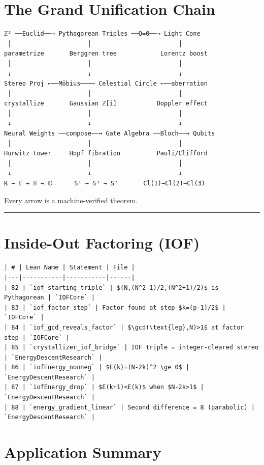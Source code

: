 \documentclass[12pt,a4paper,openany]{book}
\begin{document}
\section{The Grand Unification Chain}

\begin{verbatim}
ℤ² ──Euclid──→ Pythagorean Triples ──Q=0──→ Light Cone
 │                     │                        │
parametrize       Berggren tree            Lorentz boost
 │                     │                        │
 ↓                     ↓                        ↓
Stereo Proj ←──Möbius──── Celestial Circle ←──aberration
 │                     │                        │
crystallize       Gaussian ℤ[i]           Doppler effect
 │                     │                        │
 ↓                     ↓                        ↓
Neural Weights ──compose──→ Gate Algebra ──Bloch──→ Qubits
 │                     │                        │
Hurwitz tower     Hopf fibration          Pauli/Clifford
 │                     │                        │
 ↓                     ↓                        ↓
ℝ → ℂ → ℍ → 𝕆      S¹ → S³ → S⁷       Cl(1)→Cl(2)→Cl(3)
\end{verbatim}

Every arrow is a machine-verified theorem.

\bigskip\hrule\bigskip


\section{Inside-Out Factoring (IOF)}

\begin{verbatim}
| # | Lean Name | Statement | File |
|---|-----------|-----------|------|
| 82 | `iof_starting_triple` | $(N,(N^2-1)/2,(N^2+1)/2)$ is Pythagorean | `IOFCore` |
| 83 | `iof_factor_step` | Factor found at step $k=(p-1)/2$ | `IOFCore` |
| 84 | `iof_gcd_reveals_factor` | $\gcd(\text{leg},N)>1$ at factor step | `IOFCore` |
| 85 | `crystallizer_iof_bridge` | IOF triple = integer-cleared stereo | `EnergyDescentResearch` |
| 86 | `iofEnergy_nonneg` | $E(k)=(N-2k)^2 \ge 0$ | `EnergyDescentResearch` |
| 87 | `iofEnergy_drop` | $E(k+1)<E(k)$ when $N-2k>1$ | `EnergyDescentResearch` |
| 88 | `energy_gradient_linear` | Second difference = 8 (parabolic) | `EnergyDescentResearch` |
\end{verbatim}

\section{Application Summary}
\end{document}
